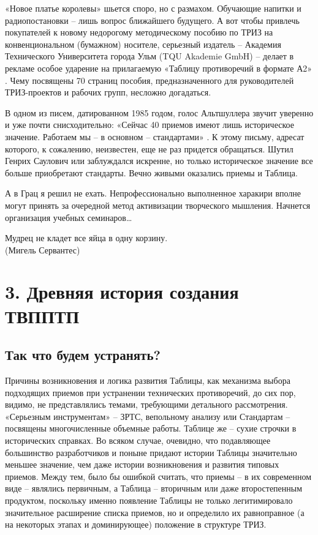 \documentclass[11pt,a4paper]{article}
\begin{document}
«Новое платье королевы» шьется споро, но с размахом. Обучающие напитки и
радиопостановки -- лишь вопрос ближайшего будущего. А вот чтобы привлечь
покупателей к новому недорогому методическому пособию по ТРИЗ на
конвенциональном (бумажном) носителе, серьезный издатель -- Академия
Технического Университета города Ульм (TQU Akademie GmbH) -- делает в рекламе
особое ударение на прилагаемую «Таблицу противоречий в формате А2»
\cite{Blaesing2001}. Чему посвящены 70 страниц пособия, предназначенного для
руководителей ТРИЗ-проектов и рабочих групп, несложно догадаться.

В одном из писем, датированном 1985 годом, голос Альтшуллера звучит уверенно и
уже почти снисходительно: «Сейчас 40 приемов имеют лишь историческое значение.
Работаем мы -- в основном -- стандартами» \cite{Altshuller1985}.  К этому
письму, адресат которого, к сожалению, неизвестен, еще не раз придется
обращаться. Шутил Генрих Саулович или заблуждался искренне, но только
историческое значение все больше приобретают стандарты. Вечно живыми оказались
приемы и Таблица.

А в Грац я решил не ехать. Непрофессионально выполненное харакири вполне могут
принять за очередной метод активизации творческого мышления. Начнется
организация учебных семинаров…

\clearpage
\begin{flushright}
  Мудрец не кладет все яйца в одну корзину.\\
  (Мигель Сервантес)
\end{flushright}
\section*{3. Древняя история создания ТВППТП}

\subsection*{Так что будем устранять?}

Причины возникновения и логика развития Таблицы, как механизма выбора
подходящих приемов при устранении технических противоречий, до сих пор,
видимо, не представлялись темами, требующими детального рассмотрения.
«Серьезным инструментам» -- ЗРТС, вепольному анализу или Стандартам --
посвящены многочисленные объемные работы. Таблице же -- сухие строчки в
исторических справках. Во всяком случае, очевидно, что подавляющее большинство
разработчиков и поныне придают истории Таблицы значительно меньшее значение,
чем даже истории возникновения и развития типовых приемов. Между тем, было бы
ошибкой считать, что приемы -- в их современном виде -- являлись первичным, а
Таблица -- вторичным или даже второстепенным продуктом, поскольку именно
появление Таблицы не только легитимировало значительное расширение списка
приемов, но и определило их равноправное (а на некоторых этапах и
доминирующее) положение в структуре ТРИЗ.
\end{document}
